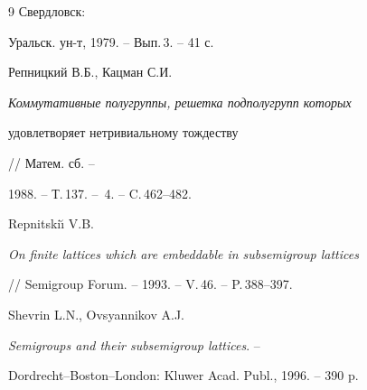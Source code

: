 \begin{thebibliography}{9}
Свердловск:


Уральск. ун-т, 1979. -- Вып.\,3. -- 41 с.




Репницкий В.Б., Кацман С.И.


{\em Коммутативные полугруппы, решетка подполугрупп которых


удовлетворяет нетривиальному тождеству} // Матем. сб. -- 


1988. -- Т.\,137. -- \No\,4. -- C.\,462--482.




Repnitski\u\i{} V.B. 


{\em On finite lattices which are embeddable in subsemigroup lattices}


// Semigroup Forum. -- 1993. -- V.\,46. -- P.\,388--397.




Shevrin L.N., Ovsyannikov A.J.


{\em Semigroups and their subsemigroup lattices}. --


Dordrecht--Boston--London: Kluwer Acad. Publ., 1996. -- 390 p.





\end{thebibliography}





\vskip 2cm












\label{end}








